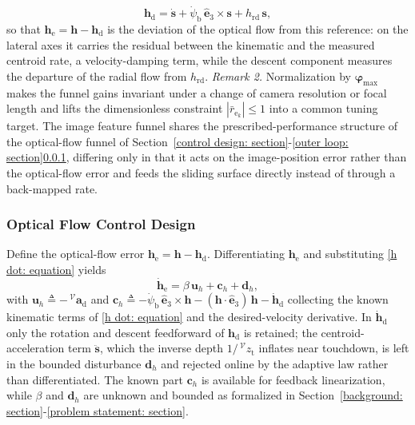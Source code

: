 \documentclass{IEEEtaes}
\begin{document}
\begin{equation} \label{h_d final: equation}
    \boldsymbol{h}_\text{d} = \dot{\boldsymbol{s}} + \dot{\psi}_\text{b}\,\hat{\boldsymbol{e}}_3\times\boldsymbol{s} + h_\text{rd}\,\boldsymbol{s},
\end{equation}
so that $\boldsymbol{h}_\text{e}=\boldsymbol{h}-\boldsymbol{h}_\text{d}$ is the deviation of the optical flow from this reference: on the lateral axes it carries the residual between the kinematic and the measured centroid rate, a velocity-damping term, while the descent component measures the departure of the radial flow from $h_\text{rd}$.
\textit{Remark 2.} Normalization by $\boldsymbol{\varphi}_\text{max}$ makes the funnel gains invariant under a change of camera resolution or focal length and lifts the dimensionless constraint $|\bar{r}_{\text{e}_k}|\le 1$ into a common tuning target. The image feature funnel shares the prescribed-performance structure of the optical-flow funnel of Section~\ref{control design: section}-\ref{outer loop: section}\ref{optic flow control: section}, differing only in that it acts on the image-position error rather than the optical-flow error and feeds the sliding surface directly instead of through a back-mapped rate.

\subsubsection{Optical Flow Control Design} \label{optic flow control: section}
Define the optical-flow error $\boldsymbol{h}_\text{e}=\boldsymbol{h}-\boldsymbol{h}_\text{d}$. Differentiating $\boldsymbol{h}_\text{e}$ and substituting \eqref{h dot: equation} yields
\begin{equation} \label{h_e_dot_1: equation}
    \dot{\boldsymbol{h}}_\text{e} = \beta\,\boldsymbol{u}_h + \boldsymbol{c}_h + \boldsymbol{d}_h,
\end{equation}
with $\boldsymbol{u}_h \triangleq -\,^\mathcal{V}\boldsymbol{a}_\text{d}$ and $\boldsymbol{c}_h \triangleq -\dot{\psi}_\text{b}\,\hat{\boldsymbol{e}}_3\times\boldsymbol{h} - (\boldsymbol{h}\cdot\hat{\boldsymbol{e}}_3)\,\boldsymbol{h} - \dot{\boldsymbol{h}}_\text{d}$ collecting the known kinematic terms of \eqref{h dot: equation} and the desired-velocity derivative. In $\dot{\boldsymbol{h}}_\text{d}$ only the rotation and descent feedforward of $\boldsymbol{h}_\text{d}$ is retained; the centroid-acceleration term $\ddot{\boldsymbol{s}}$, which the inverse depth $1/\,^\mathcal{V}z_\text{t}$ inflates near touchdown, is left in the bounded disturbance $\boldsymbol{d}_h$ and rejected online by the adaptive law rather than differentiated. The known part $\boldsymbol{c}_h$ is available for feedback linearization, while $\beta$ and $\boldsymbol{d}_h$ are unknown and bounded as formalized in Section~\ref{background: section}-\ref{problem statement: section}.
\end{document}
